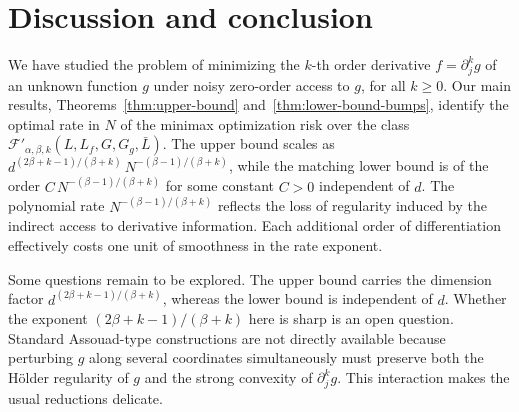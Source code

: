 \documentclass{article}
\renewcommand{\geq}{\geqslant}
\renewcommand{\le}{\leqslant}
\theoremstyle{definition}
\begin{document}
\section{Discussion and conclusion}
We have studied the problem of minimizing the $k$-th order
derivative $f=\partial_j^k g$ of an unknown
function $g$ under noisy zero-order access to $g$, for all
$k\geq 0$. Our main results, Theorems~\ref{thm:upper-bound}
and~\ref{thm:lower-bound-bumps}, identify the optimal rate in $N$
of the minimax optimization risk over the class
$\mathcal{F}'_{\alpha,\beta,k}(L,L_f,G,G_g,\bar{L})$. The upper
bound scales as 
$d^{(2\beta+k-1)/(\beta+k)}\,N^{-(\beta-1)/(\beta+k)}$, while the
matching lower bound is of the order
$C\,N^{-(\beta-1)/(\beta+k)}$ for some constant $C>0$ independent
of $d$. 
The polynomial rate $N^{-(\beta-1)/(\beta+k)}$ reflects the loss
of regularity induced by the indirect access to derivative
information. Each additional order of differentiation effectively
costs one unit of smoothness in the rate exponent. 



Some questions remain to be explored.
The upper bound carries
the dimension factor $d^{(2\beta+k-1)/(\beta+k)}$, whereas the
lower bound is independent of $d$. Whether the exponent
$(2\beta+k-1)/(\beta+k)$ here is sharp is an open question. Standard
Assouad-type constructions are not directly available because
perturbing $g$ along several coordinates simultaneously must
preserve both the H\"older regularity of $g$ and the strong
convexity of $\partial_j^k g$. This interaction makes the usual
reductions delicate.

\end{document}
